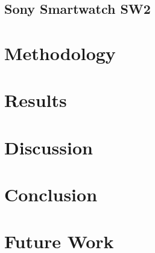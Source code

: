 \documentclass{article}
\begin{document}
	\subsection{Sony Smartwatch SW2}
	
\section{Methodology}

\section{Results}

\section{Discussion}

\section{Conclusion}

\section{Future Work}




\vspace*{2\baselineskip} %

\begin{thebibliography}{9}
\end{thebibliography}
\end{document}
